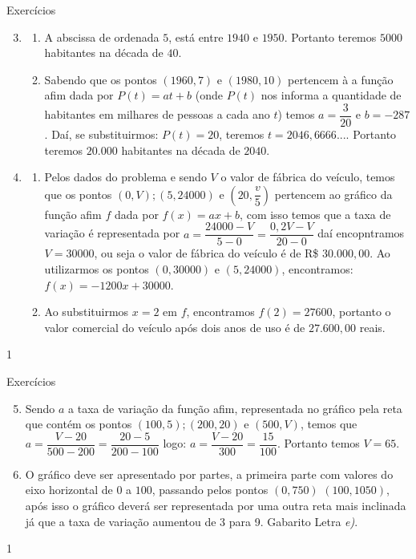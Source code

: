 \clearmargin
\begin{answer}{Exercícios}
{\exerciselist
\begin{enumerate}\setcounter{enumi}{2}
\item 
\begin{enumerate}
\item A abscissa de ordenada $5$, está entre $1940$ e $1950$. Portanto teremos $5000$ habitantes na década de $40$.

\item Sabendo que os pontos $(1960,7)$ e $(1980,10)$ pertencem à a função afim dada por $P(t)=at+b$ (onde $P(t)$ nos informa a quantidade de habitantes em milhares de pessoas a cada ano $t$) temos $a=\dfrac{3}{20}$ e $b=−287$. Daí, se substituirmos: $P(t)=20$, teremos $t=2046,6666....$ Portanto teremos $20.000$ habitantes na década de $2040$.
\end{enumerate}

\item 
\begin{enumerate}
\item Pelos dados do problema e sendo $V$ o valor de fábrica do veículo, temos que os pontos $(0,V) ; (5,24000)$ e $(20,\dfrac{v}{5})$ pertencem ao gráfico da função afim $f$ dada por $f(x)=ax+b$, com isso temos que a taxa de variação é representada por $a=\dfrac{24000-V}{5−0}=\dfrac{0{,}2V-V}{20−0}$ daí encopntramos $V=30000$, ou seja o valor de fábrica do veículo é de R\$ $30.000{,}00$.
Ao utilizarmos os pontos $(0,30000)$ e $(5,24000)$, encontramos: $f(x)=-1200x+30000$.

\item Ao substituirmos $x=2$ em $f$, encontramos $f(2)=27600$, portanto o valor comercial do veículo após dois anos de uso é de $27.600{,}00$ reais.
\end{enumerate}
\end{enumerate}
}{1}
\end{answer}
\clearmargin
\begin{answer}{Exercícios}
{\exerciselist
\begin{enumerate}\setcounter{enumi}{4}
\item Sendo $a$ a taxa de variação da função afim, representada no gráfico pela reta que contém os pontos $(100,5) ; (200,20)$ e $(500,V)$, temos que $a=\dfrac{V-20}{500-200}=\dfrac{20-5}{200−100}$ logo: $a=\dfrac{V-20}{300}=\dfrac{15}{100}$. Portanto temos $V=65$.

\item O gráfico deve ser apresentado por partes, a primeira parte com valores do eixo horizontal de $0$ a $100$, passando pelos pontos $(0,750)$ $(100,1050)$, após isso o gráfico deverá ser representada por uma outra reta mais inclinada já que a taxa de variação aumentou de 3 para 9. Gabarito Letra \textit{e)}.

\end{enumerate}
}{1}
\end{answer}
